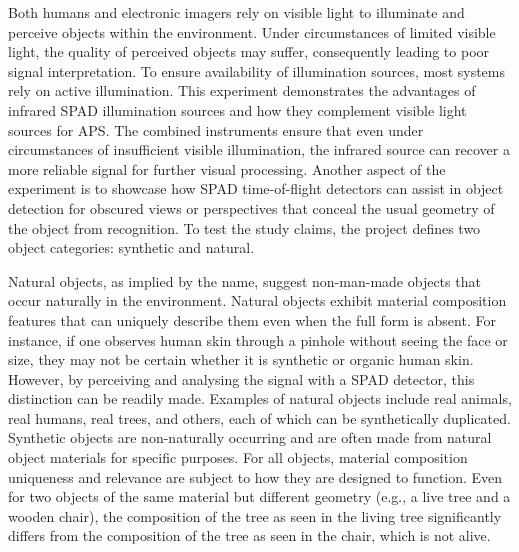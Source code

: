 \documentclass[12pt,a4paper,oneside]{report}
\begin{document}
Both humans and electronic imagers rely on visible light to illuminate and perceive objects within the environment. Under circumstances of limited visible light, the quality of perceived objects may suffer, consequently leading to poor signal interpretation. To ensure availability of illumination sources, most systems rely on active illumination. This experiment demonstrates the advantages of infrared SPAD illumination sources and how they complement visible light sources for APS. The combined instruments ensure that even under circumstances of insufficient visible illumination, the infrared source can recover a more reliable signal for further visual processing. Another aspect of the experiment is to showcase how SPAD time-of-flight detectors can assist in object detection for obscured views or perspectives that conceal the usual geometry of the object from recognition. To test the study claims, the project defines two object categories: synthetic and natural.

Natural objects, as implied by the name, suggest non-man-made objects that occur naturally in the environment. Natural objects exhibit material composition features that can uniquely describe them even when the full form is absent. For instance, if one observes human skin through a pinhole without seeing the face or size, they may not be certain whether it is synthetic or organic human skin. However, by perceiving and analysing the signal with a SPAD detector, this distinction can be readily made. Examples of natural objects include real animals, real humans, real trees, and others, each of which can be synthetically duplicated. Synthetic objects are non-naturally occurring and are often made from natural object materials for specific purposes. For all objects, material composition uniqueness and relevance are subject to how they are designed to function. Even for two objects of the same material but different geometry (e.g., a live tree and a wooden chair), the composition of the tree as seen in the living tree significantly differs from the composition of the tree as seen in the chair, which is not alive.
\end{document}
